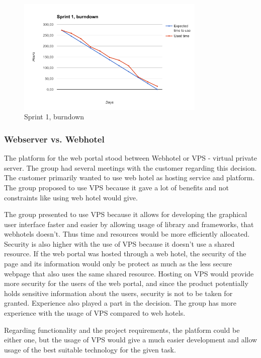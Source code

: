 \begin{figure}[h!]
\centering
    \includegraphics[width=0.8\textwidth]{fig/sprint1}
\caption{Sprint 1, burndown}
\end{figure}


\subsubsection{Webserver vs. Webhotel}
The platform for the web portal stood between Webhotel or VPS - virtual private server.  The group had several meetings with the customer regarding this decision. The customer primarily wanted to use web hotel as hosting service and platform. The group proposed to use VPS because it gave a lot of benefits and not constraints like using web hotel would give. 

The group presented to use VPS because it allows for developing the graphical user interface faster and easier by allowing usage of library and frameworks, that webhotels doesn't.  Thus time and resources would be more efficiently allocated. Security is also higher with the use of VPS because it doesn't use a shared resource. If the web portal was hosted through a web hotel, the security of the page and its information would only be protect as much as the less secure webpage that also uses the same shared resource. Hosting on VPS would provide more security for the users of the web portal, and since the product potentially holds sensitive information about the users, security is not to be taken for granted.  Experience also played a part in the decision. The group has more experience with the usage of VPS compared to web hotels. 

Regarding functionality and the project requirements, the platform could be either one, but the usage of VPS would give a much easier development and allow usage of the best suitable technology for the given task. 

